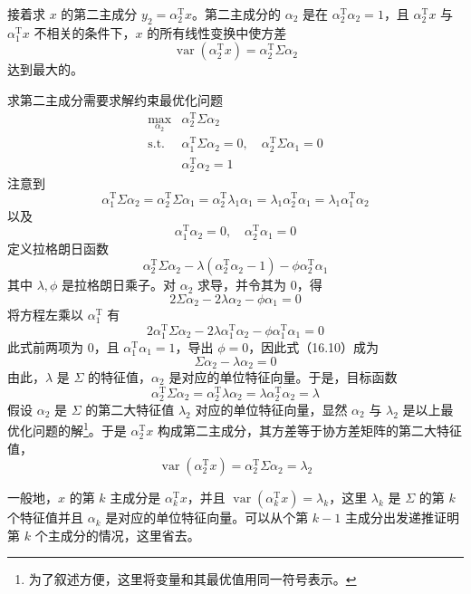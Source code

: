 \documentclass[UTF8,12pt,a4paper,fontset=fandol]{ctexart}
\begin{document}
接着求 $x$ 的第二主成分 $y_2=\alpha_2^{\mathrm{T}}x$。第二主成分的 $\alpha_2$ 是在 $\alpha_2^{\mathrm{T}}\alpha_2=1$，且 $\alpha_2^{\mathrm{T}}x$ 与 $\alpha_1^{\mathrm{T}}x$ 不相关的条件下，$x$ 的所有线性变换中使方差
\[
\operatorname{var}(\alpha_2^{\mathrm{T}}x)=\alpha_2^{\mathrm{T}}\Sigma\alpha_2
\]
达到最大的。

求第二主成分需要求解约束最优化问题
\begin{equation}
\begin{array}{ll}
\displaystyle\max_{\alpha_2} & \alpha_2^{\mathrm{T}}\Sigma\alpha_2\\[0.4em]
\mathrm{s.t.} & \alpha_1^{\mathrm{T}}\Sigma\alpha_2=0,\quad \alpha_2^{\mathrm{T}}\Sigma\alpha_1=0\\
& \alpha_2^{\mathrm{T}}\alpha_2=1
\end{array}
\tag{16.9}
\end{equation}
注意到
\[
\alpha_1^{\mathrm{T}}\Sigma\alpha_2=\alpha_2^{\mathrm{T}}\Sigma\alpha_1
=\alpha_2^{\mathrm{T}}\lambda_1\alpha_1
=\lambda_1\alpha_2^{\mathrm{T}}\alpha_1
=\lambda_1\alpha_1^{\mathrm{T}}\alpha_2
\]
以及
\[
\alpha_1^{\mathrm{T}}\alpha_2=0,\quad \alpha_2^{\mathrm{T}}\alpha_1=0
\]
定义拉格朗日函数
\[
\alpha_2^{\mathrm{T}}\Sigma\alpha_2-\lambda(\alpha_2^{\mathrm{T}}\alpha_2-1)-\phi\alpha_2^{\mathrm{T}}\alpha_1
\]
其中 $\lambda,\phi$ 是拉格朗日乘子。对 $\alpha_2$ 求导，并令其为 0，得
\begin{equation}
2\Sigma\alpha_2-2\lambda\alpha_2-\phi\alpha_1=0
\tag{16.10}
\end{equation}
将方程左乘以 $\alpha_1^{\mathrm{T}}$ 有
\[
2\alpha_1^{\mathrm{T}}\Sigma\alpha_2-2\lambda\alpha_1^{\mathrm{T}}\alpha_2-\phi\alpha_1^{\mathrm{T}}\alpha_1=0
\]
此式前两项为 0，且 $\alpha_1^{\mathrm{T}}\alpha_1=1$，导出 $\phi=0$，因此式（16.10）成为
\[
\Sigma\alpha_2-\lambda\alpha_2=0
\]
由此，$\lambda$ 是 $\Sigma$ 的特征值，$\alpha_2$ 是对应的单位特征向量。于是，目标函数
\[
\alpha_2^{\mathrm{T}}\Sigma\alpha_2=\alpha_2^{\mathrm{T}}\lambda\alpha_2=\lambda\alpha_2^{\mathrm{T}}\alpha_2=\lambda
\]
假设 $\alpha_2$ 是 $\Sigma$ 的第二大特征值 $\lambda_2$ 对应的单位特征向量，显然 $\alpha_2$ 与 $\lambda_2$ 是以上最优化问题的解\footnote{为了叙述方便，这里将变量和其最优值用同一符号表示。}。于是 $\alpha_2^{\mathrm{T}}x$ 构成第二主成分，其方差等于协方差矩阵的第二大特征值，
\begin{equation}
\operatorname{var}(\alpha_2^{\mathrm{T}}x)=\alpha_2^{\mathrm{T}}\Sigma\alpha_2=\lambda_2
\tag{16.11}
\end{equation}

一般地，$x$ 的第 $k$ 主成分是 $\alpha_k^{\mathrm{T}}x$，并且 $\operatorname{var}(\alpha_k^{\mathrm{T}}x)=\lambda_k$，这里 $\lambda_k$ 是 $\Sigma$ 的第 $k$ 个特征值并且 $\alpha_k$ 是对应的单位特征向量。可以从个第 $k-1$ 主成分出发递推证明第 $k$ 个主成分的情况，这里省去。
\end{document}
